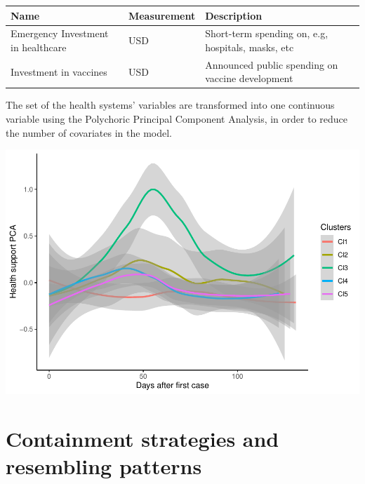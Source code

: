 \documentclass[
  6pt,
]{article}
\begin{document}
\begin{longtable}[]{@{}lll@{}}
\toprule
\begin{minipage}[b]{0.30\columnwidth}\raggedright
\textbf{Name}\strut
\end{minipage} & \begin{minipage}[b]{0.2\columnwidth}\raggedright
\textbf{Measurement} \strut
\end{minipage} & \begin{minipage}[b]{0.4\columnwidth}\raggedright
\textbf{Description}\strut
\end{minipage}\tabularnewline
\midrule
\endhead
\begin{minipage}[t]{0.4\columnwidth}\raggedright
Emergency Investment in healthcare\strut
\end{minipage} & \begin{minipage}[t]{0.11\columnwidth}\raggedright
USD\strut
\end{minipage} & \begin{minipage}[t]{0.47\columnwidth}\raggedright
Short-term spending on, e.g, hospitals, masks, etc\strut
\end{minipage}\tabularnewline
\begin{minipage}[t]{0.33\columnwidth}\raggedright
Investment in vaccines\strut
\end{minipage} & \begin{minipage}[t]{0.11\columnwidth}\raggedright
USD\strut
\end{minipage} & \begin{minipage}[t]{0.47\columnwidth}\raggedright
Announced public spending on vaccine development\strut
\end{minipage}\tabularnewline
\bottomrule
\end{longtable}

The set of the health systems' variables are transformed into one
continuous variable using the Polychoric Principal Component Analysis,
in order to reduce the number of covariates in the model.
\begin{center}
\includegraphics[width=.7\textwidth]{Report_SC_Group3_files/figure-latex/unnamed-chunk-13-1.pdf}
\end{center}
\hypertarget{containment-strategies-and-resembling-patterns}{%
\section{Containment strategies and resembling
patterns}\label{containment-strategies-and-resembling-patterns}}
\end{document}
